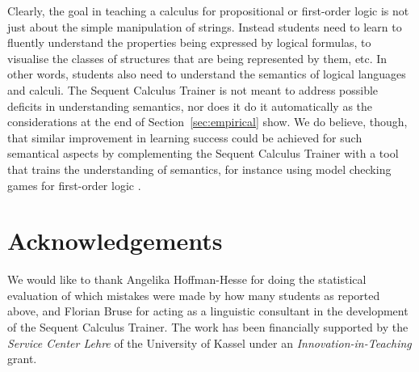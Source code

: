 \documentclass[a4paper,UKenglish]{lipics}
\begin{document}
Clearly, the goal in teaching a calculus for propositional or first-order logic is not just about the simple manipulation of strings. Instead students 
need to learn to fluently understand the properties being expressed by logical formulas, to visualise the classes of structures that are being
represented by them, etc. In other words, students also need to understand the semantics of logical languages and calculi. The Sequent Calculus Trainer
is not meant to address possible deficits in understanding semantics, nor does it do it automatically as the considerations at the end of 
Section~\ref{sec:empirical} show. We do believe, though, that similar improvement in learning success could be achieved for such semantical aspects by
complementing the Sequent Calculus Trainer with a tool that trains the understanding of semantics, for instance using model checking games for
first-order logic \cite{Gradel:2005:FMT:1206819}.


\section*{Acknowledgements}

We would like to thank Angelika Hoffman-Hesse for doing the statistical evaluation of which mistakes were made by how many students as reported above,
and Florian Bruse for acting as a linguistic consultant in the development of the Sequent Calculus Trainer. The work has been financially supported by
the \emph{Service Center Lehre} of the University of Kassel under an \emph{Innovation-in-Teaching} grant.

        
 
\end{document}
